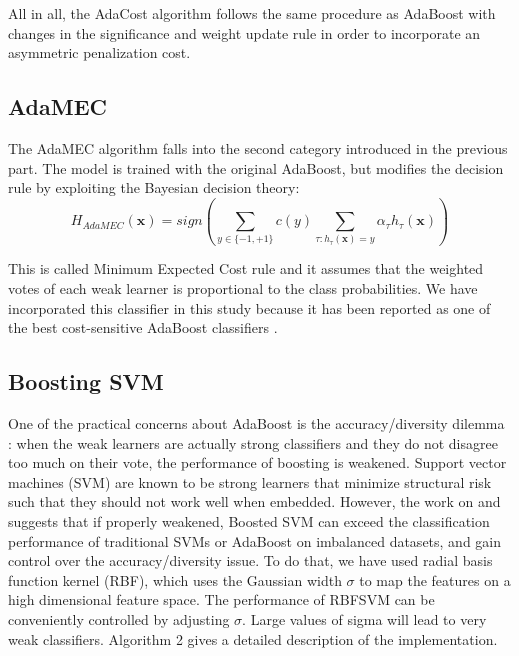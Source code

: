 \documentclass[conference]{IEEEtran}
\begin{document}
All in all, the AdaCost algorithm follows the same procedure as AdaBoost with changes in the significance and weight update rule in order to incorporate an asymmetric penalization cost.

\subsection{AdaMEC}
The AdaMEC algorithm falls into the second category introduced in the previous part. The model is trained with the original AdaBoost, but modifies the decision rule by exploiting the Bayesian decision theory:
$$ H_{AdaMEC}(\boldsymbol x) = sign \left( \sum_{y \in \{-1,+1\}} c(y) \sum_{\tau: h_{\tau}(\boldsymbol x)=y} \alpha_{\tau} h_{\tau}(\boldsymbol x)\right)$$

This is called Minimum Expected Cost rule and it assumes that the weighted votes of each weak learner is proportional to the class probabilities. We have incorporated this classifier in this study because it has been reported as one of the best cost-sensitive AdaBoost classifiers \cite{need_boosting}.


\subsection{Boosting SVM}
One of the practical concerns about AdaBoost is the accuracy/diversity dilemma \cite{study_boosted_svm}: when the weak learners are actually strong classifiers and they do not disagree too much on their vote, the performance of boosting is weakened. Support vector machines (SVM) are known to be strong learners that minimize structural risk such that they should not work well when embedded. However, the work on \cite{study_boosted_svm} and \cite{boosting_svm} suggests that if properly weakened, Boosted SVM can exceed the classification performance of traditional SVMs or AdaBoost on imbalanced datasets, and gain control over the accuracy/diversity issue. To do that, we have used radial basis function kernel (RBF), which uses the Gaussian width $\sigma$ to map the features on a high dimensional feature space. The performance of RBFSVM can be conveniently controlled by adjusting $\sigma$. Large values of sigma will lead to very weak classifiers. Algorithm 2 gives a detailed description of the implementation.
\end{document}
